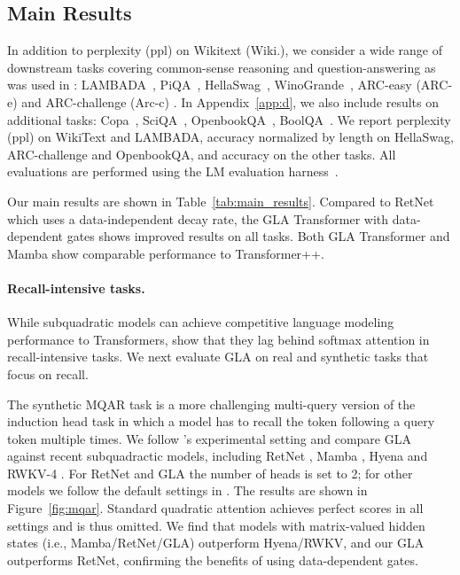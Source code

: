 \vspace{-2mm}
\subsection{Main Results}
\vspace{-2mm}

In addition to perplexity (ppl) on Wikitext (Wiki.), we consider a wide range of downstream tasks covering common-sense reasoning and question-answering as was used in \citet{Gu2023MambaLS}: LAMBADA~\citep[LMB.; ][]{paperno2016lambada}, PiQA~\citep{bisk2020piqa}, HellaSwag~\citep[Hella.; ][]{zellers2019hellaswag}, WinoGrande~\citep[Wino.;][]{sakaguchi2021winogrande}, ARC-easy (ARC-e) and ARC-challenge (Arc-c) \citep{arc-ce}.
In Appendix~\ref{app:d}, we also include results on additional tasks: Copa~\citep{copa}, SciQA~\citep{SciQA2023}, OpenbookQA~\citep{openbookqa}, BoolQA~\citep{clark2019boolq}. We report perplexity (ppl) on WikiText and LAMBADA, accuracy normalized by length on
HellaSwag, ARC-challenge and OpenbookQA, and accuracy on the other tasks. All evaluations are performed using the LM evaluation harness~\citep{eval-harness}.






Our main results are shown in Table~\ref{tab:main_results}. Compared to RetNet which uses a data-independent decay rate, the GLA Transformer with data-dependent gates shows improved results on all tasks. Both GLA Transformer and Mamba show comparable performance to Transformer++. 
\vspace{-2mm}


\paragraph{Recall-intensive tasks.} While subquadratic models can achieve competitive language modeling performance to Transformers, \citet{Arora2024SimpleLA} show that they  lag behind softmax attention in recall-intensive tasks. We next  evaluate GLA on real and synthetic tasks that focus on recall. 

The synthetic MQAR task \cite{zoology} is a more challenging multi-query version of the induction head task \cite{h3} in which a model has to recall the token following a query token multiple times.   We follow 
\citet{zoology}'s experimental setting and compare GLA against recent subquadractic models, including RetNet \cite{sun2023retentive}, Mamba \cite{Gu2023MambaLS}, Hyena \cite{hyena} and  RWKV-4 \cite{rwkv}. For RetNet and GLA the number of heads is set to 2; for other models we follow the default settings in \citet{zoology}. The results are shown in Figure~\ref{fig:mqar}. Standard quadratic attention achieves perfect scores in all settings and is thus omitted. We find that models with matrix-valued hidden states (i.e., Mamba/RetNet/GLA) outperform Hyena/RWKV, and our GLA outperforms RetNet, confirming the benefits of using data-dependent gates.


